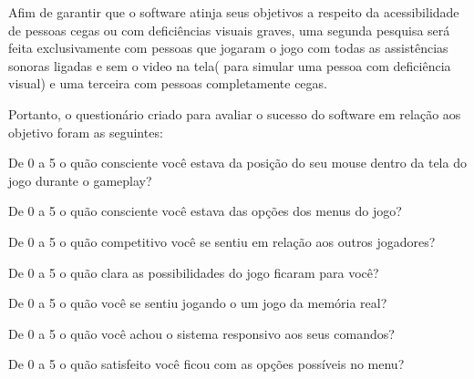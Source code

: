 Afim de garantir que o software atinja seus objetivos a respeito da acessibilidade de pessoas cegas ou com deficiências visuais graves, uma segunda pesquisa será feita exclusivamente com pessoas que jogaram o jogo com todas as assistências sonoras ligadas e sem o video na tela( para simular uma pessoa com deficiência visual) e uma terceira com pessoas completamente cegas.

Portanto, o questionário criado para avaliar o sucesso do software em relação aos objetivo foram as seguintes:

\begin{questao}
  \item De 0 a 5 o quão consciente você estava da posição do seu mouse dentro da tela do jogo durante o gameplay?
  \item De 0 a 5 o quão consciente você estava das opções dos menus do jogo?
  \item De 0 a 5 o quão competitivo você se sentiu em relação aos outros jogadores?
  \item De 0 a 5 o quão clara as possibilidades do jogo ficaram para você?
  \item De 0 a 5 o quão você se sentiu jogando o um jogo da memória real?
  \item De 0 a 5 o quão você achou o sistema responsivo aos seus comandos?
  \item De 0 a 5 o quão satisfeito você ficou com as opções possíveis no menu? 
\end{questao}
